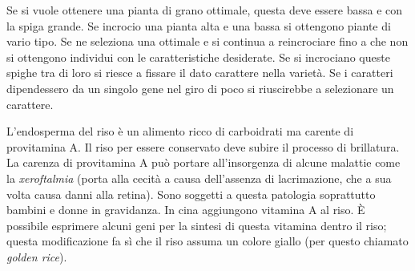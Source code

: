 \documentclass[]{article}
\begin{document}
Se si vuole ottenere una pianta di grano ottimale, questa deve essere
bassa e con la spiga grande. Se incrocio una pianta alta e una bassa si
ottengono piante di vario tipo. Se ne seleziona una ottimale e si
continua a reincrociare fino a che non si ottengono individui con le
caratteristiche desiderate. Se si incrociano queste spighe tra di loro
si riesce a fissare il dato carattere nella varietà. Se i caratteri
dipendessero da un singolo gene nel giro di poco si riuscirebbe a
selezionare un carattere.

L'endosperma del riso è un alimento ricco di carboidrati ma carente di
provitamina A. Il riso per essere conservato deve subire il processo di
brillatura. La carenza di provitamina A può portare all'insorgenza di
alcune malattie come la \emph{xeroftalmia} (porta alla cecità a causa
dell'assenza di lacrimazione, che a sua volta causa danni alla retina).
Sono soggetti a questa patologia soprattutto bambini e donne in
gravidanza. In cina aggiungono vitamina A al riso. È possibile esprimere
alcuni geni per la sintesi di questa vitamina dentro il riso; questa
modificazione fa sì che il riso assuma un colore giallo (per questo
chiamato \emph{golden rice}).
\end{document}
